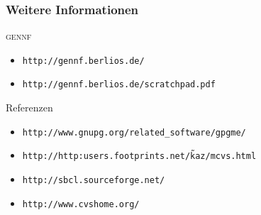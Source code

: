 \documentclass[german]{beamer}
\newcommand{\GENNF}{\textsc{gennf}}
\begin{document}
\begin{frame}
  \frametitle{Weitere Informationen}
  \begin{block}{\GENNF}
    \begin{itemize}
    \item \tt{http://gennf.berlios.de/}
    \item \tt{http://gennf.berlios.de/scratchpad.pdf}
    \end{itemize}
  \end{block}
  \begin{block}{Referenzen}
    \begin{itemize}
    \item \tt{http://www.gnupg.org/related\_software/gpgme/}
    \item \tt{http://http:users.footprints.net/\~kaz/mcvs.html}
    \item \tt{http://sbcl.sourceforge.net/}
    \item \tt{http://www.cvshome.org/}
    \end{itemize}
  \end{block}
\end{frame}
\end{document}
